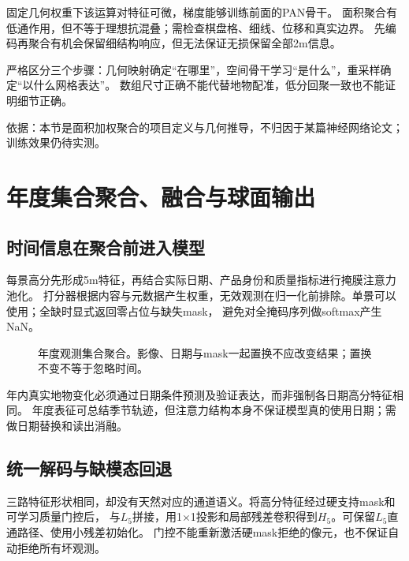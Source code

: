 \documentclass[UTF8,fontset=fandol,zihao=5,a4paper]{ctexart}
\newcommand{\note}[1]{\par\smallskip\noindent\colorbox{pale}{\parbox{0.95\linewidth}{\small #1}}\par\smallskip}
\newcommand{\source}[1]{\par{\footnotesize\color{muted}依据：#1}\par}
\newcommand{\reportpage}{\clearpage}
\begin{document}
固定几何权重下该运算对特征可微，梯度能够训练前面的PAN骨干。
面积聚合有低通作用，但不等于理想抗混叠；需检查棋盘格、细线、位移和真实边界。
先编码再聚合有机会保留细结构响应，但无法保证无损保留全部2m信息。

\note{严格区分三个步骤：几何映射确定“在哪里”，空间骨干学习“是什么”，重采样确定“以什么网格表达”。
数组尺寸正确不能代替地物配准，低分回聚一致也不能证明细节正确。}
\source{本节是面积加权聚合的项目定义与几何推导，不归因于某篇神经网络论文；训练效果仍待实测。}

\reportpage
\section{年度集合聚合、融合与球面输出}
\subsection{时间信息在聚合前进入模型}
每景高分先形成5m特征，再结合实际日期、产品身份和质量指标进行掩膜注意力池化。
打分器根据内容与元数据产生权重，无效观测在归一化前排除。单景可以使用；全缺时显式返回零占位与缺失mask，
避免对全掩码序列做softmax产生NaN。

\begin{figure}[h]
\centering
{}
\caption{年度观测集合聚合。影像、日期与mask一起置换不应改变结果；置换不变不等于忽略时间。}
\end{figure}

年内真实地物变化必须通过日期条件预测及验证表达，而非强制各日期高分特征相同。
年度表征可总结季节轨迹，但注意力结构本身不保证模型真的使用日期；需做日期替换和读出消融。

\subsection{统一解码与缺模态回退}
三路特征形状相同，却没有天然对应的通道语义。将高分特征经过硬支持mask和可学习质量门控后，
与$L_5$拼接，用1$\times$1投影和局部残差卷积得到$H_5$。可保留$L_5$直通路径、使用小残差初始化。
门控不能重新激活硬mask拒绝的像元，也不保证自动拒绝所有坏观测。
\end{document}
